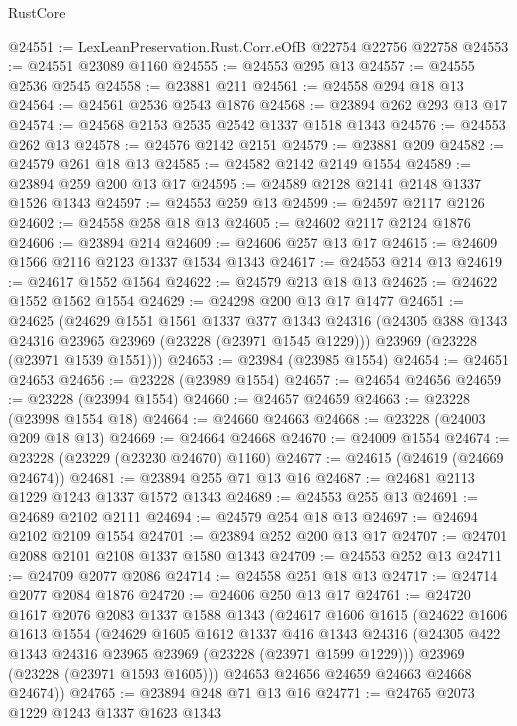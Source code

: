 \begin{lexlean}{RustCore}
\begin{coremodule}
@24551 := LexLeanPreservation.Rust.Corr.eOfB @22754 @22756 @22758
@24553 := @24551 @23089 @1160
@24555 := @24553 @295 @13
@24557 := @24555 @2536 @2545
@24558 := @23881 @211
@24561 := @24558 @294 @18 @13
@24564 := @24561 @2536 @2543 @1876
@24568 := @23894 @262 @293 @13 @17
@24574 := @24568 @2153 @2535 @2542 @1337 @1518 @1343
@24576 := @24553 @262 @13
@24578 := @24576 @2142 @2151
@24579 := @23881 @209
@24582 := @24579 @261 @18 @13
@24585 := @24582 @2142 @2149 @1554
@24589 := @23894 @259 @200 @13 @17
@24595 := @24589 @2128 @2141 @2148 @1337 @1526 @1343
@24597 := @24553 @259 @13
@24599 := @24597 @2117 @2126
@24602 := @24558 @258 @18 @13
@24605 := @24602 @2117 @2124 @1876
@24606 := @23894 @214
@24609 := @24606 @257 @13 @17
@24615 := @24609 @1566 @2116 @2123 @1337 @1534 @1343
@24617 := @24553 @214 @13
@24619 := @24617 @1552 @1564
@24622 := @24579 @213 @18 @13
@24625 := @24622 @1552 @1562 @1554
@24629 := @24298 @200 @13 @17 @1477
@24651 := @24625
    (@24629
      @1551
      @1561
      @1337
      @377
      @1343
      @24316
      (@24305 @388 @1343 @24316 @23965 @23969 (@23228 (@23971 @1545 @1229)))
      @23969
      (@23228 (@23971 @1539 @1551)))
@24653 := @23984 (@23985 @1554)
@24654 := @24651 @24653
@24656 := @23228 (@23989 @1554)
@24657 := @24654 @24656
@24659 := @23228 (@23994 @1554)
@24660 := @24657 @24659
@24663 := @23228 (@23998 @1554 @18)
@24664 := @24660 @24663
@24668 := @23228 (@24003 @209 @18 @13)
@24669 := @24664 @24668
@24670 := @24009 @1554
@24674 := @23228 (@23229 (@23230 @24670) @1160)
@24677 := @24615 (@24619 (@24669 @24674))
@24681 := @23894 @255 @71 @13 @16
@24687 := @24681 @2113 @1229 @1243 @1337 @1572 @1343
@24689 := @24553 @255 @13
@24691 := @24689 @2102 @2111
@24694 := @24579 @254 @18 @13
@24697 := @24694 @2102 @2109 @1554
@24701 := @23894 @252 @200 @13 @17
@24707 := @24701 @2088 @2101 @2108 @1337 @1580 @1343
@24709 := @24553 @252 @13
@24711 := @24709 @2077 @2086
@24714 := @24558 @251 @18 @13
@24717 := @24714 @2077 @2084 @1876
@24720 := @24606 @250 @13 @17
@24761 := @24720
    @1617
    @2076
    @2083
    @1337
    @1588
    @1343
    (@24617
      @1606
      @1615
      (@24622
        @1606
        @1613
        @1554
        (@24629
          @1605
          @1612
          @1337
          @416
          @1343
          @24316
          (@24305 @422 @1343 @24316 @23965 @23969 (@23228 (@23971 @1599 @1229)))
          @23969
          (@23228 (@23971 @1593 @1605)))
        @24653
        @24656
        @24659
        @24663
        @24668
        @24674))
@24765 := @23894 @248 @71 @13 @16
@24771 := @24765 @2073 @1229 @1243 @1337 @1623 @1343

\end{coremodule}
\end{lexlean}
